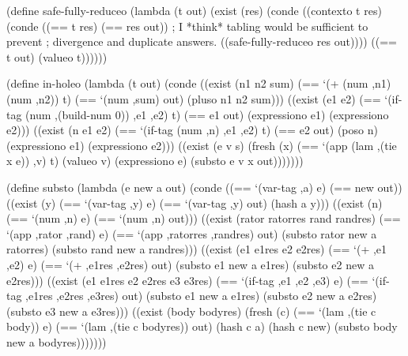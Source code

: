 \schemedisplayspace
\begin{schemedisplay}
(define safe-fully-reduceo
  (lambda (t out)
    (exist (res)
      (conde
        ((contexto t res)
         (conde
           ((== t res) (== res out))
           ; I *think* tabling would be sufficient to prevent
           ; divergence and duplicate answers.
           ((safe-fully-reduceo res out))))
        ((== t out) (valueo t))))))
\end{schemedisplay}

\schemedisplayspace
\begin{schemedisplay}
(define in-holeo
  (lambda (t out)
    (conde
      ((exist (n1 n2 sum)
         (== `(+ (num ,n1) (num ,n2)) t)
         (== `(num ,sum) out)
         (pluso n1 n2 sum)))
      ((exist (e1 e2)
         (== `(if-tag (num ,(build-num 0)) ,e1 ,e2) t)
         (== e1 out)
         (expressiono e1)
         (expressiono e2)))
      ((exist (n e1 e2)
         (== `(if-tag (num ,n) ,e1 ,e2) t)
         (== e2 out)
         (poso n)
         (expressiono e1)
         (expressiono e2)))
      ((exist (e v s)
         (fresh (x)
           (== `(app (lam ,(tie x e)) ,v) t)
           (valueo v)
           (expressiono e)
           (substo e v x out)))))))
\end{schemedisplay}

\schemedisplayspace
\begin{schemedisplay}
(define substo
  (lambda (e new a out)
    (conde
      ((== `(var-tag ,a) e) (== new out))
      ((exist (y)
         (== `(var-tag ,y) e)
         (== `(var-tag ,y) out)
         (hash a y)))
      ((exist (n)
         (== `(num ,n) e)
         (== `(num ,n) out)))
      ((exist (rator ratorres rand randres)
         (== `(app ,rator ,rand) e)
         (== `(app ,ratorres ,randres) out)
         (substo rator new a ratorres)
         (substo rand new a randres)))
      ((exist (e1 e1res e2 e2res)
         (== `(+ ,e1 ,e2) e)
         (== `(+ ,e1res ,e2res) out)
         (substo e1 new a e1res)
         (substo e2 new a e2res)))
      ((exist (e1 e1res e2 e2res e3 e3res)
         (== `(if-tag ,e1 ,e2 ,e3) e)
         (== `(if-tag ,e1res ,e2res ,e3res) out)
         (substo e1 new a e1res)
         (substo e2 new a e2res)
         (substo e3 new a e3res)))      
      ((exist (body bodyres)
         (fresh (c)
           (== `(lam ,(tie c body)) e)
           (== `(lam ,(tie c bodyres)) out)
           (hash c a)
           (hash c new)
           (substo body new a bodyres)))))))
\end{schemedisplay}

